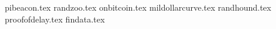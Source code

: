 {pibeacon.tex}
{randzoo.tex}
{onbitcoin.tex}
{mildollarcurve.tex}
{randhound.tex}
{proofofdelay.tex}
{findata.tex}


